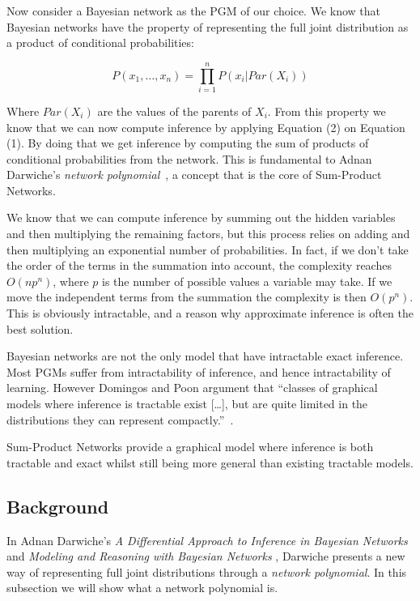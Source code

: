 \documentclass[a4paper,10pt]{article}
\theoremstyle{plain}
\begin{document}
Now consider a Bayesian network as the PGM of our choice. We know that Bayesian networks have the
property of representing the full joint distribution as a product of conditional probabilities:

\begin{equation}
  P(x_1,\ldots,x_n) = \prod_{i=1}^n P(x_i|Par(X_i))
\end{equation}

Where $Par(X_i)$ are the values of the parents of $X_i$. From this property we know that we can
now compute inference by applying Equation (2) on Equation (1). By doing that we get inference by
computing the sum of products of conditional probabilities from the network. This is fundamental
to Adnan Darwiche's \textit{network polynomial}~\cite{diff-approach-darwiche,bayes-net-darwiche},
a concept that is the core of Sum-Product Networks.

We know that we can compute inference by summing out the hidden variables and then multiplying the
remaining factors, but this process relies on adding and then multiplying an exponential number of
probabilities. In fact, if we don't take the order of the terms in the summation into account, the
complexity reaches $O(np^n)$, where $p$ is the number of possible values a variable may take. If we
move the independent terms from the summation the complexity is then $O(p^n)$. This is obviously
intractable, and a reason why approximate inference is often the best solution.

Bayesian networks are not the only model that have intractable exact inference. Most PGMs suffer
from intractability of inference, and hence intractability of learning. However Domingos and Poon
argument that ``classes of graphical models where inference is tractable exist [\ldots], but are
quite limited in the distributions they can represent compactly.''~\cite{poon-domingos}.

Sum-Product Networks provide a graphical model where inference is both tractable and exact whilst
still being more general than existing tractable models.

\subsection{Background}

In Adnan Darwiche's \textit{A Differential Approach to Inference in Bayesian Networks}
\cite{diff-approach-darwiche} and \textit{Modeling and Reasoning with Bayesian Networks}
\cite{bayes-net-darwiche}, Darwiche presents a new way of representing full joint distributions
through a \textit{network polynomial}. In this subsection we will show what a network polynomial
is.
\end{document}

